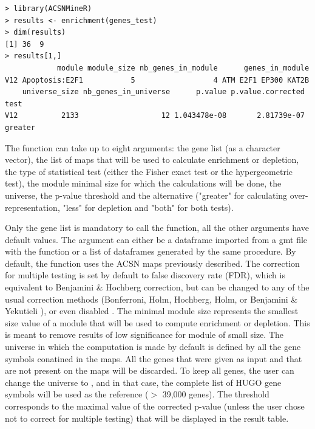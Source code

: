 \documentclass[article]{jss}
\begin{document}
\begin{verbatim}
> library(ACSNMineR)
> results <- enrichment(genes_test)
> dim(results)
[1] 36  9
> results[1,]
            module module_size nb_genes_in_module      genes_in_module
V12 Apoptosis:E2F1           5                  4 ATM E2F1 EP300 KAT2B
    universe_size nb_genes_in_universe      p.value p.value.corrected    test
V12          2133                   12 1.043478e-08       2.81739e-07 greater
\end{verbatim}



The  function can take up to eight arguments: the gene list (as
a character vector), the list of maps that will be used to calculate enrichment
or depletion, the type of statistical test (either the Fisher exact test or the
hypergeometric test), the module minimal size for which the calculations will be
done, the universe, the p-value threshold and the alternative ("greater" for
calculating over-representation, "less" for depletion and "both" for both
tests).

Only the gene list is mandatory to call the  function, all the
other arguments have default values.  The  argument can either be a
dataframe imported from a gmt file with the  function or
a list of dataframes generated by the same procedure. By default, the function
uses the ACSN maps previously described.  The correction for multiple testing
is set by default to false discovery rate (FDR), which is equivalent to
Benjamini \& Hochberg correction, but can be changed to any of the usual
correction methods (Bonferroni, Holm, Hochberg, Holm, or Benjamini \& Yekutieli
\citep{Benjamini2003FDR}), or even disabled .  The minimal module size
represents the smallest size value of a module that will be used to compute
enrichment or depletion. This is meant to remove results of low significance
for module of small size.  The universe in which the computation is made by
default is defined by all the gene symbols conatined in the maps. All the genes
that were given as input and that are not present on the maps will be
discarded. To keep all genes, the user can change the universe to ,
and in that case, the complete list of HUGO gene symbols will be used as the
reference ($>$ 39,000 genes). The threshold corresponds to the maximal value of the
corrected p-value (unless the user chose not to correct for multiple testing) that
will be displayed in the result table.
\end{document}

